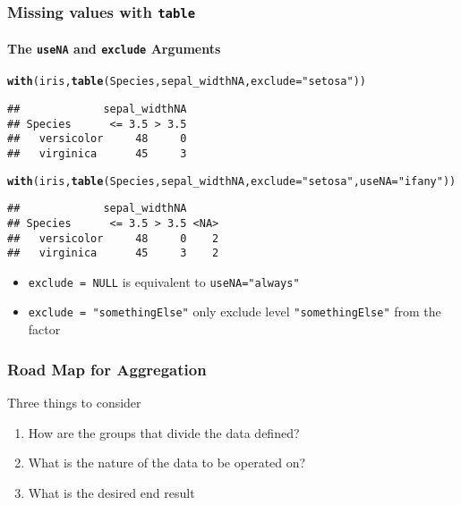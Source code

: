 \documentclass[paper=screen,mathserif]{beamer}\usepackage[]{graphicx}\usepackage[]{color}
\makeatletter
\newcommand{\hlstr}[1]{\textcolor[rgb]{0.192,0.494,0.8}{#1}}%
\newcommand{\hlstd}[1]{\textcolor[rgb]{0.345,0.345,0.345}{#1}}%
\newcommand{\hlkwc}[1]{\textcolor[rgb]{0.333,0.667,0.333}{#1}}%
\newcommand{\hlkwd}[1]{\textcolor[rgb]{0.737,0.353,0.396}{\textbf{#1}}}%
\newenvironment{kframe}{%
 \def\at@end@of@kframe{}%
 \ifinner\ifhmode%
  \def\at@end@of@kframe{\end{minipage}}%
  \begin{minipage}{\columnwidth}%
 \fi\fi%
 \def\FrameCommand##1{\hskip\@totalleftmargin \hskip-\fboxsep
 \colorbox{shadecolor}{##1}\hskip-\fboxsep
     \hskip-\linewidth \hskip-\@totalleftmargin \hskip\columnwidth}%
 \MakeFramed {\advance\hsize-\width
   \@totalleftmargin\z@ \linewidth\hsize
   \@setminipage}}%
 {\par\unskip\endMakeFramed%
 \at@end@of@kframe}
\newenvironment{knitrout}{}{} %
\newcommand{\ft}[1]{\frametitle{#1}}
\newcommand{\fst}[1]{\framesubtitle{#1}}
\makeatother
\begin{document}
\begin{frame}[fragile]
  \ft{Missing values with {\tt table}}
    \fst{The {\tt useNA} and {\tt exclude} Arguments}
\begin{knitrout}\scriptsize
{}\color{fgcolor}\begin{kframe}
\begin{alltt}
\hlkwd{with}\hlstd{(iris,} \hlkwd{table}\hlstd{(Species, sepal_widthNA,} \hlkwc{exclude} \hlstd{=} \hlstr{"setosa"}\hlstd{))}
\end{alltt}
\begin{verbatim}
##             sepal_widthNA
## Species      <= 3.5 > 3.5
##   versicolor     48     0
##   virginica      45     3
\end{verbatim}
\begin{alltt}
\hlkwd{with}\hlstd{(iris,} \hlkwd{table}\hlstd{(Species, sepal_widthNA,} \hlkwc{exclude} \hlstd{=} \hlstr{"setosa"}\hlstd{,} \hlkwc{useNA} \hlstd{=} \hlstr{"ifany"}\hlstd{))}
\end{alltt}
\begin{verbatim}
##             sepal_widthNA
## Species      <= 3.5 > 3.5 <NA>
##   versicolor     48     0    2
##   virginica      45     3    2
\end{verbatim}
\end{kframe}
\end{knitrout}
\begin{itemize}
\item \verb|exclude = NULL| is equivalent to \verb|useNA="always"|
\item \verb|exclude = "somethingElse"| only exclude level
  \verb="somethingElse"= from the factor
\end{itemize}
\end{frame}

\begin{frame}[fragile]
  \ft{Road Map for Aggregation}
  
  Three things to consider
  \begin{enumerate}
  \item How are the groups that divide the data defined?
  \item What is the nature of the data to be operated on?
  \item What is the desired end result
  \end{enumerate}
  
\end{frame}
\end{document}
